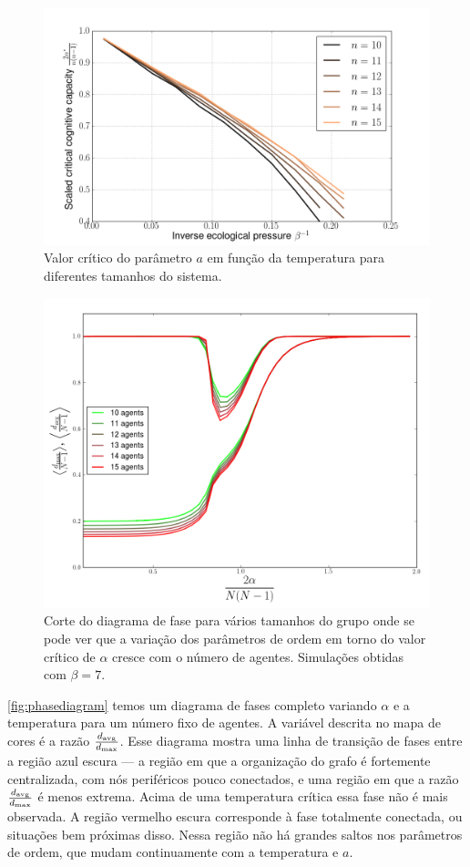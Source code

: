 \begin{figure}
  \includegraphics[width = \textwidth]{figuras/critical.png}
  \caption{Valor crítico do parâmetro $a$ em função da temperatura para diferentes tamanhos do sistema.}
  \label{fig:critical}
\end{figure}
\begin{figure}
  \includegraphics[width = \textwidth]{./figuras/manysizes.png}
  \caption[Corte do diagrama de fase para vários tamanhos do grupo.]{Corte do diagrama de fase para vários tamanhos do grupo onde se pode ver que a variação dos parâmetros de ordem em torno do valor crítico de $\alpha$ cresce com o número de agentes. Simulações obtidas com $\beta = 7$.}
  \label{fig:corte}
\end{figure}
\newpage
{}\ref{fig:phasediagram} temos um diagrama de fases completo variando $\alpha$ e a temperatura para um número fixo de agentes. A variável descrita no mapa de cores é a razão $\frac{d_{\text{avg}}}{d_{\text{max}}}$. Esse diagrama mostra uma linha de transição de fases entre a região azul escura --- a região em que a organização do grafo é fortemente centralizada, com nós periféricos pouco conectados, e uma região em que a razão $\frac{d_{\text{avg}}}{d_{\text{max}}}$ é menos extrema. Acima de uma temperatura crítica essa fase não é mais observada. A região vermelho escura corresponde à fase totalmente conectada, ou situações bem próximas disso. Nessa região não há grandes saltos nos parâmetros de ordem, que mudam continuamente com a temperatura e $a$. 

